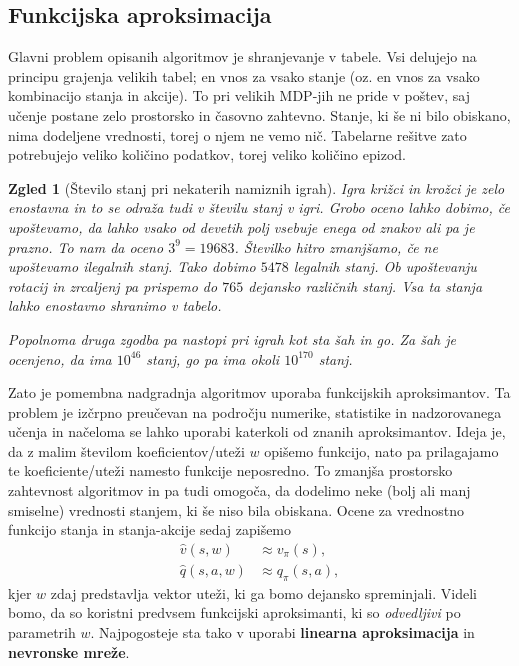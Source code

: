 \documentclass[12pt,a4paper]{amsart}
\theoremstyle{definition} %
\theoremstyle{plain} %
\newtheorem{zgled}[definicija]{Zgled}
\begin{document}
\subsection{Funkcijska aproksimacija}
Glavni problem opisanih algoritmov je shranjevanje v tabele. Vsi delujejo na principu grajenja 
velikih tabel; en vnos za vsako stanje (oz. en vnos za vsako kombinacijo stanja in akcije). To pri 
velikih MDP-jih ne pride v poštev, saj učenje postane zelo prostorsko in časovno zahtevno. Stanje, 
ki še ni bilo obiskano, nima dodeljene vrednosti, torej o njem ne vemo nič. Tabelarne rešitve zato 
potrebujejo veliko količino podatkov, torej veliko količino epizod.  

\begin{zgled}[Število stanj pri nekaterih namiznih igrah]
    Igra križci in krožci je zelo enostavna in to se odraža tudi v številu stanj v igri. 
    Grobo oceno lahko dobimo, če upoštevamo, da lahko vsako od devetih polj vsebuje enega od znakov 
    ali pa je prazno. To nam da oceno $3^9 = 19683$. Številko hitro zmanjšamo, če ne upoštevamo 
    ilegalnih stanj. Tako dobimo $5478$ legalnih stanj. Ob upoštevanju rotacij in zrcaljenj pa 
    prispemo do $765$ dejansko različnih stanj. Vsa ta stanja lahko enostavno shranimo v tabelo. 

    Popolnoma druga zgodba pa nastopi pri igrah kot sta šah in go. Za šah je ocenjeno, da ima 
    $10^{46}$ stanj, go pa ima okoli $10^{170}$ stanj.
\end{zgled}

Zato je pomembna nadgradnja algoritmov uporaba funkcijskih aproksimantov. Ta problem je izčrpno 
preučevan na področju numerike, statistike in nadzorovanega učenja in načeloma se lahko uporabi 
katerkoli od znanih aproksimantov. Ideja je, da z malim številom koeficientov/uteži $w$ opišemo 
funkcijo, nato pa prilagajamo te koeficiente/uteži namesto funkcije neposredno. To zmanjša prostorsko 
zahtevnost algoritmov in pa tudi omogoča, da dodelimo neke (bolj ali manj smiselne) vrednosti stanjem, 
ki še niso bila obiskana. Ocene za vrednostno funkcijo stanja in stanja-akcije sedaj zapišemo
\begin{align*}
    \hat{v}(s, w) &\approx v_\pi(s), \\
    \hat{q}(s, a, w) &\approx q_\pi(s, a), 
\end{align*}
kjer $w$ zdaj predstavlja vektor uteži, ki ga bomo dejansko spreminjali. Videli bomo, da so koristni
predvsem funkcijski aproksimanti, ki so \textit{odvedljivi} po parametrih $w$. Najpogosteje sta tako v 
uporabi \textbf{linearna aproksimacija} in \textbf{nevronske mreže}. 
\end{document}

